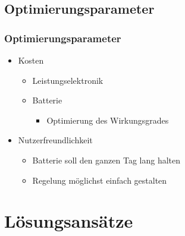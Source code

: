 \documentclass{beamer}
\begin{document}
	\subsection{Optimierungsparameter}
	\begin{frame}
		\frametitle{Optimierungsparameter}
		\begin{itemize}
			\item{Kosten}
			\begin{itemize}
				\item{Leistungselektronik}
				\item{Batterie}
				\begin{itemize}
					\item{Optimierung des Wirkungsgrades}
				\end{itemize}
			\end{itemize}
			\item{Nutzerfreundlichkeit}
			\begin{itemize}
				\item{Batterie soll den ganzen Tag lang halten}
				\item{Regelung möglichst einfach gestalten}
			\end{itemize}
		\end{itemize}
	\end{frame}
	\section{Lösungsansätze}
\end{document}
